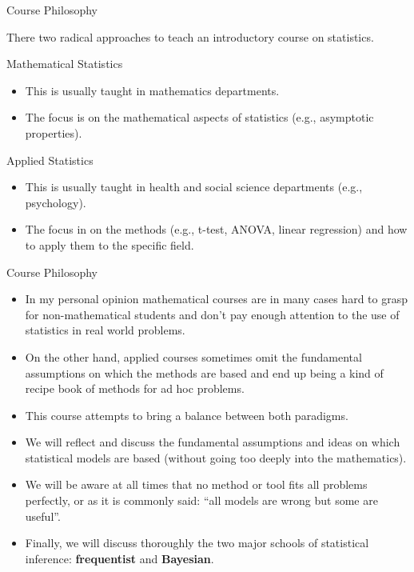 \documentclass[handout]{beamer}
\begin{document}
\begin{frame}{Course Philosophy}

\scriptsize{
There two radical approaches to teach an introductory course on statistics.
\begin{block}{Mathematical Statistics}
 \begin{itemize}
\item This is usually taught in mathematics departments.
\item The focus is on the mathematical aspects of statistics (e.g., asymptotic properties).
\end{itemize}
\end{block}


\begin{block}{Applied Statistics}
 \begin{itemize}
\item This is usually taught in health and social science departments (e.g., psychology).
\item The focus in on the methods (e.g., t-test, ANOVA, linear regression) and how to apply them to the specific field.
\end{itemize}
\end{block}




}
 
\end{frame}

\begin{frame}{Course Philosophy}

\scriptsize{
 \begin{itemize}
\item In my personal opinion mathematical courses are in many cases hard to grasp for non-mathematical students and don't pay enough attention to the use of statistics in real world problems.
\item On the other hand, applied courses sometimes omit the fundamental assumptions on which the methods are based and end up being a kind of recipe book of methods for ad hoc problems. 

\item This course attempts to bring a balance between both paradigms.

\item We will reflect and discuss the fundamental assumptions and ideas on which statistical models are based (without going too deeply into the mathematics). 

\item We will be aware at all times that no method or tool fits all problems perfectly, or as it is commonly said: ``all models are wrong but some are useful''.

\item  Finally, we will discuss thoroughly the two major schools of statistical inference: \textbf{frequentist} and \textbf{Bayesian}.

\end{itemize}



}
 
\end{frame}
\end{document}

